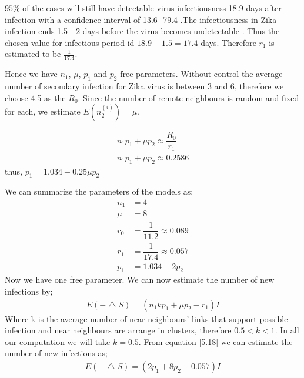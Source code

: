 $95\%$ of the cases will still have detectable virus infectiousness 18.9 days after infection with a confidence interval of 13.6 -79.4  \citep{lessler2016times}.The infectiousness in Zika infection ends 1.5 - 2 days before the virus becomes undetectable \citep{funk2016comparative}. Thus the chosen value for infectious period id $18.9 - 1.5 = 17.4$ days. Therefore $r_1$ is estimated  to be $\frac{1}{17.4}$.

Hence we have $n_1$, $\mu$, $p_1$ and $p_2$ free parameters. Without control the average number of secondary infection for Zika virus is between 3 and 6, therefore we choose 4.5 as the $R_0$. Since the number of remote neighbours is random and fixed for each, we estimate $E (n^{(i)}_2) = \mu$.

\begin{align}
n_1 p_1 + \mu p_2 \approx \dfrac{R_0}{r_1} 
\\ n_1 p_1 + \mu p_2 \approx 0.2586
\end{align}
thus, 
$p_1 =  1.034 - 0.25 \mu p_2$

We can summarize the parameters of the models as;
\begin{align}
n_1 &= 4 \\
\mu &= 8 \\
r_0 &= \dfrac{1}{11.2} \approx 0.089 \\
r_1 &= \dfrac{1}{17.4} \approx 0.057 \\
p_1 &= 1.034 - 2 p_2
\end{align}
Now we have one free parameter. We can now estimate the number of new infections by;
\begin{align}
E(- \bigtriangleup S) = (n_1 k p_1 + \mu p_2 - r_1) I \label{5.18}
\end{align}
Where k is the average number of near neighbours' links that support possible infection and near neighbours are arrange in clusters, therefore $0.5 <k <1$. In all our computation we will take $k = 0.5$. From equation \ref{5.18} we can estimate the number of new infections as;
\begin{align}
E(- \bigtriangleup S) = (2 p_1 + 8 p_2 - 0.057) I  \label{5.1.9}
\end{align}